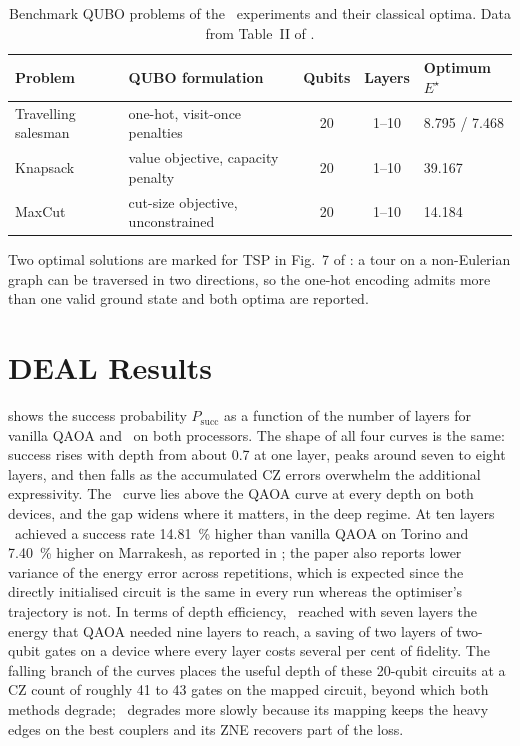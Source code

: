 \begin{table}[htbp]
\caption{Benchmark QUBO problems of the \deal\ experiments and their classical optima. Data from Table~II of \cite{guo2025deal}.}
\label{tab:nisq:problems}
\centering\small
\begin{threeparttable}
\begin{tabular}{@{}llccl@{}}
\toprule
Problem & QUBO formulation & Qubits & Layers & Optimum $E^{\star}$ \\
\midrule
Travelling salesman & one-hot, visit-once penalties & 20 & 1--10 & 8.795 / 7.468\tnote{a} \\
Knapsack            & value objective, capacity penalty & 20 & 1--10 & 39.167 \\
MaxCut              & cut-size objective, unconstrained & 20 & 1--10 & 14.184 \\
\bottomrule
\end{tabular}
\begin{tablenotes}\footnotesize
\item[a] Two optimal solutions are marked for TSP in Fig.~7 of \cite{guo2025deal}: a tour on a non-Eulerian graph can be traversed in two directions, so the one-hot encoding admits more than one valid ground state and both optima are reported.
\end{tablenotes}
\end{threeparttable}
\end{table}

\section{DEAL Results}\label{sec:nisq:deal-results}

 shows the success probability $P_{\mathrm{succ}}$ as a function of the number of layers for vanilla QAOA and \deal\ on both processors. The shape of all four curves is the same: success rises with depth from about 0.7 at one layer, peaks around seven to eight layers, and then falls as the accumulated CZ errors overwhelm the additional expressivity. The \deal\ curve lies above the QAOA curve at every depth on both devices, and the gap widens where it matters, in the deep regime. At ten layers \deal\ achieved a success rate \SI{14.81}{\percent} higher than vanilla QAOA on Torino and \SI{7.40}{\percent} higher on Marrakesh, as reported in \cite{guo2025deal}; the paper also reports lower variance of the energy error across repetitions, which is expected since the directly initialised circuit is the same in every run whereas the optimiser's trajectory is not. In terms of depth efficiency, \deal\ reached with seven layers the energy that QAOA needed nine layers to reach, a saving of two layers of two-qubit gates on a device where every layer costs several per cent of fidelity. The falling branch of the curves places the useful depth of these 20-qubit circuits at a CZ count of roughly 41 to 43 gates on the mapped circuit, beyond which both methods degrade; \deal\ degrades more slowly because its mapping keeps the heavy edges on the best couplers and its ZNE recovers part of the loss.

